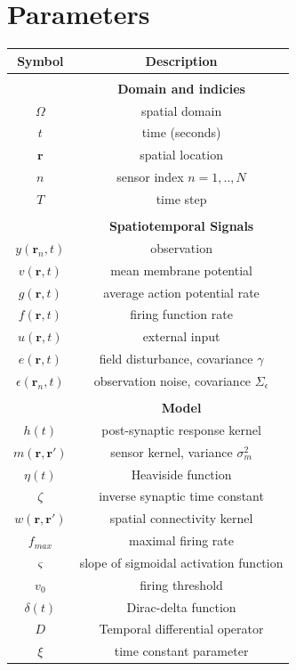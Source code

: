 \documentclass[twocolumn,11pt,a4paper]{article}		%
\begin{document}
\section{Parameters} 
\begin{tabular}
	{c|c} Symbol & Description \\
	\hline
	\\ & \textbf{Domain and indicies} \\
	\hline
	$\Omega$ & spatial domain \\
	$t$ & time (seconds) \\
	$\mathbf{r}$ & spatial location \\
	$n$ & sensor index $n=1,..,N$ \\
	$T$ & time step \\
	\\ & \textbf{Spatiotemporal Signals} \\
	\hline
	$y(\mathbf{r}_n,t)$ & observation \\
	$v(\mathbf{r},t)$ & mean membrane potential \\
	$g(\mathbf{r},t)$ & average action potential rate \\
	$f(\mathbf{r},t)$ & firing function rate \\
	$u(\mathbf{r},t)$ & external input \\
	$e(\mathbf{r},t)$ & field disturbance, covariance $\gamma$\\
	$\epsilon(\mathbf{r}_n,t)$ & observation noise, covariance $\Sigma_\epsilon$ \\
	\\ & \textbf{Model} \\
	\hline
	$h(t)$ & post-synaptic response kernel \\
	$m(\mathbf{r},\mathbf{r}')$ & sensor kernel, variance $\sigma_m^2$ \\
	$\eta(t)$ & Heaviside function \\
	$\zeta$ & inverse synaptic time constant \\
	$w(\mathbf{r},\mathbf{r}')$ & spatial connectivity kernel \\
	$f_{max}$ & maximal firing rate \\
	$\varsigma$ & slope of sigmoidal activation function \\
	$v_0$ & firing threshold \\
	$\delta(t)$ & Dirac-delta function \\
	$D$ & Temporal differential operator \\
	$\xi$ & time constant parameter \\

\end{tabular}
\end{document}

